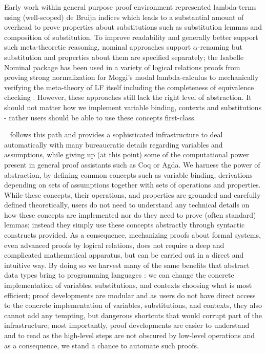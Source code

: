 Early work \citep{Berardi:WLF90,CCoquand:92,Altenkirch:TLCA93}  within general purpose proof environment represented lambda-terms using (well-scoped) de Bruijn indices which leads to a substantial amount of overhead to prove properties about substitutions such as substitution lemmas and composition of substitution. To improve readability and generally better support such meta-theoretic reasoning, nominal approaches support $\alpha$-renaming but substitution and properties about them are specified separately; the Isabelle Nominal package \citep{Urban:JAR08} has been used in a variety of logical relations proofs from proving strong normalization for Moggi's modal lambda-calculus \citep{Doczkal:LFMTP09} to mechanically verifying the meta-theory of LF itself including the completeness of equivalence checking \citep{Narboux:LFMTP08,Urban:TOCL11}.  However,  these approaches still lack the right level of abstraction. It should not matter how we implement variable binding, contexts and substitutions - rather users should be able to use these concepts first-class. 

\beluga~\citep{Pientka:IJCAR10,Pientka:CADE15} follows this path and provides a sophisticated infrastructure to deal automatically with many bureaucratic details regarding variables and  assumptions, while giving up  (at this point) some of the computational power present in general proof assistants such as Coq or Agda.  We harness the power of abstraction, by defining common concepts such as variable binding, derivations depending on sets of assumptions together with sets of operations and properties. While these concepts, their operations, and properties are grounded and carefully defined theoretically, users do not need to understand any technical details on how these concepts are implemented nor do they need to prove (often standard) lemmas;  instead they simply use these concepts abstractly through syntactic constructs provided. As a consequence, mechanizing proofs about formal systems, even advanced proofs by logical relations, does not require a deep and complicated mathematical apparatus, but can be carried out in a direct and intuitive way.  By doing so we harvest many of the same benefits that abstract data types bring to programming languages \cite{Liskov:PowerAbstraction}: we can change the concrete implementation of variables, substitutions, and contexts choosing what is most efficient;  proof developments are modular and as users do not have direct access to the concrete implementation of variables, substitutions, and contexts, they also cannot add any tempting, but dangerous shortcuts that would corrupt part of the infrastructure; most importantly, proof developments are easier to understand and to read as the high-level steps are not obscured by low-level operations and as a consequence, we stand a chance to automate such proofs.

